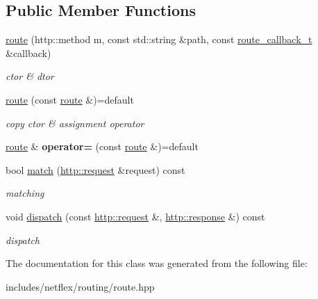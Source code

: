 \subsection*{Public Member Functions}
\begin{DoxyCompactItemize}
\item 
\mbox{\label{classnetflex_1_1routing_1_1route_a15868bae2313eaf230380fbb6266a153}} 
\hyperlink{classnetflex_1_1routing_1_1route_a15868bae2313eaf230380fbb6266a153}{route} (http\+::method m, const std\+::string \&path, const \hyperlink{classnetflex_1_1routing_1_1route_a5af1479be27de20f7c395bf2fb0f3639}{route\+\_\+callback\+\_\+t} \&callback)
\begin{DoxyCompactList}\small\item\em ctor \& dtor \end{DoxyCompactList}\item 
\mbox{\label{classnetflex_1_1routing_1_1route_acb3c4755a0dc9b5385ac54a0ef75a4f4}} 
\hyperlink{classnetflex_1_1routing_1_1route_acb3c4755a0dc9b5385ac54a0ef75a4f4}{route} (const \hyperlink{classnetflex_1_1routing_1_1route}{route} \&)=default
\begin{DoxyCompactList}\small\item\em copy ctor \& assignment operator \end{DoxyCompactList}\item 
\mbox{\label{classnetflex_1_1routing_1_1route_a4c7f2bfd6148ef3d2137f01150cbdeef}} 
\hyperlink{classnetflex_1_1routing_1_1route}{route} \& {\bfseries operator=} (const \hyperlink{classnetflex_1_1routing_1_1route}{route} \&)=default
\item 
\mbox{\label{classnetflex_1_1routing_1_1route_a2c02cde61aeaae8fc15ea3fc316e9bee}} 
bool \hyperlink{classnetflex_1_1routing_1_1route_a2c02cde61aeaae8fc15ea3fc316e9bee}{match} (\hyperlink{classnetflex_1_1http_1_1request}{http\+::request} \&request) const
\begin{DoxyCompactList}\small\item\em matching \end{DoxyCompactList}\item 
\mbox{\label{classnetflex_1_1routing_1_1route_a1e6f2e7560002a10c1f037a560516666}} 
void \hyperlink{classnetflex_1_1routing_1_1route_a1e6f2e7560002a10c1f037a560516666}{dispatch} (const \hyperlink{classnetflex_1_1http_1_1request}{http\+::request} \&, \hyperlink{classnetflex_1_1http_1_1response}{http\+::response} \&) const
\begin{DoxyCompactList}\small\item\em dispatch \end{DoxyCompactList}\end{DoxyCompactItemize}


The documentation for this class was generated from the following file\+:\begin{DoxyCompactItemize}
\item 
includes/netflex/routing/route.\+hpp\end{DoxyCompactItemize}
